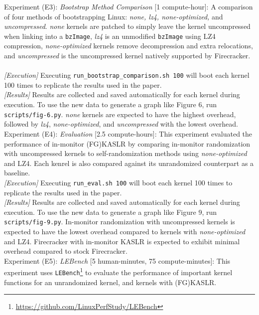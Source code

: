 \documentclass[sigplan,twocolumn]{acmart}
\begin{document}
{Experiment (E3): \textit{Bootstrap Method Comparison} [1 compute-hour]: 
A comparison of four methods of bootstrapping Linux: \textit{none,
lz4, none-optimized,} and \textit{uncompressed}. \textit{none} kernels
are patched to simply leave the kernel uncompressed when linking into a \texttt{bzImage}, \textit{lz4}
is an unmodified \texttt{bzImage} using LZ4 compression, \textit{none-optimized} kernels remove decompression
and extra relocations, and \textit{uncompressed} is the uncompressed kernel natively supported by Firecracker.
~\\

\textit{[Execution]}
Executing \texttt{run\_bootstrap\_comparison.sh 100} will
boot each kernel 100 times to replicate the results used in the paper.
\\

\textit{[Results]}
Results are collected and saved automatically for each kernel during execution. To use the new data to generate 
a graph like Figure 6, run \texttt{scripts/fig-6.py}. \textit{none} kernels are expected to have the highest overhead,
followed by \textit{lz4}, \textit{none-optimized}, and \textit{uncompressed} with the lowest overhead. 
~\\

Experiment (E4): \textit{Evaluation} [2.5 compute-hours]: 
This experiment evaluated the performance of in-monitor (FG)KASLR by comparing in-monitor randomization with uncompressed 
kernels to self-randomization methods using \textit{none-optimized} and LZ4. Each kenrel is also compared against 
its unrandomized counterpart as a baseline.
~\\

\textit{[Execution]}
Executing \texttt{run\_eval.sh 100} will
boot each kernel 100 times to replicate the results used in the paper.
\\

\textit{[Results]}
Results are collected and saved automatically for each kernel during execution. To use the new data to generate 
a graph like Figure 9, run \texttt{scripts/fig-9.py}. In-monitor randomization with uncompressed kernels is expected to
have the lowest overhead compared to kernels with \textit{none-optimized} and LZ4. Firecracker with in-monitor KASLR is expected to
exhibit minimal overhead compared to stock Firecracker.
~\\

Experiment (E5): \textit{LEBench} [5 human-minutes, 75 compute-minutes]: 
This experiment uses \texttt{LEBench}\footnote{\url{https://github.com/LinuxPerfStudy/LEBench}} to evaluate the performance
of important kernel functions for an unrandomized kernel, and kernels with (FG)KASLR. 
~\\

}
\end{document}
